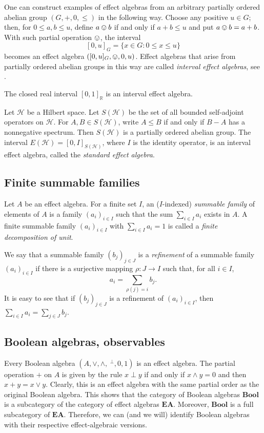 \documentclass[smallextended]{svjour3}
\begin{document}
One can construct examples of effect algebras from an arbitrary partially
ordered abelian group $(G,+,0,\leq)$ in the following way. Choose any positive $u\in
G$; then, for $0\leq a,b\leq u$, define $a\ovee b$ if and only if $a+b\leq u$
and put $a\ovee b=a+b$.  With such partial operation $\ovee$, the interval
$$
[0,u]_G=\{x\in G\colon 0\leq x\leq u\}
$$ becomes an effect algebra $([0,u]_G,\ovee,0,u)$.  Effect algebras that
arise from partially ordered abelian groups in this way are called {\em interval
effect algebras}, see \cite{BenFou:IaSEA}.

\begin{example}
The closed real interval $[0,1]_{\mathbb R}$ is an interval effect algebra. 
\end{example}
\begin{example}
Let $\mathcal H$ be a Hilbert space. Let $S(\mathcal H)$ be the set of
all bounded self-adjoint operators on $\mathcal H$. 
For $A,B\in S(\mathcal H)$, write $A\leq B$ if and only if $B-A$ has a nonnegative spectrum.
Then $S(\mathcal H)$ is a partially ordered abelian group.
The interval $E(\mathcal H)=[0,I]_{S(\mathcal H)}$, where $I$ is the identity operator,
is an interval effect algebra,
called the {\em standard effect algebra}.
\end{example}

\subsection{Finite summable families}

Let $A$ be an effect algebra. For a finite set $I$, an ($I$-indexed)
{\em summable family} of elements of $A$ is a family $(a_i)_{i\in I}$ such that the
sum
$\sum_{i\in I}a_i$
exists in $A$. A finite summable family $(a_i)_{i\in I}$ with $\sum_{i\in I}a_i=1$ is called a
{\em finite decomposition of unit}.

We say that a summable family $(b_j)_{j\in J}$ is a {\em refinement}
of a summable family $(a_i)_{i\in I}$ if there is a surjective mapping
$\rho:J\to I$ such that, for all $i\in I$,
$$
a_i=\sum_{\rho(j)=i} b_j.
$$
It is easy to see that if $(b_j)_{j\in J}$ is a refinement of $(a_i)_{i\in I}$, then
$\sum_{i\in I}a_i=\sum_{j\in J}b_j$.

\subsection{Boolean algebras, observables}
\label{subs:boolean}
Every Boolean algebra $(A,\vee,\wedge,~^\perp,0,1)$ is an effect algebra.
The partial operation $+$ on $A$ is given by the rule $x\perp y$ if and only if
$x\wedge y=0$ and then $x+y=x\vee y$. Clearly, this is an effect algebra with
the same partial order as the original Boolean algebra. This shows that the
category of Boolean algebras ${\mathbf{Bool}}$ is a subcategory of the category of effect
algebras ${\mathbf{EA}}$. Moreover, ${\mathbf{Bool}}$ is a full subcategory of ${\mathbf{EA}}$.  Therefore, we can (and
we will) identify Boolean algebras with their respective effect-algebraic
versions.
\end{document}

